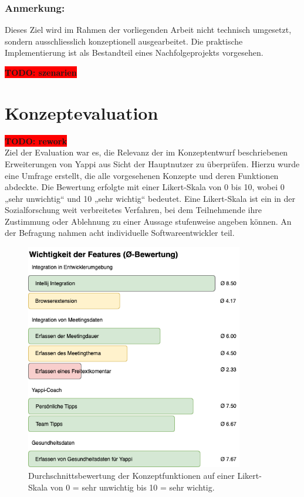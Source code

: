 \documentclass[12pt,a4paper]{report}
\newcommand{\todo}[1]{\colorbox{red}{\textbf{TODO: #1}}\\}
\begin{document}
\subsubsection{Anmerkung:}

Dieses Ziel wird im Rahmen der vorliegenden Arbeit nicht technisch umgesetzt, sondern ausschliesslich konzeptionell ausgearbeitet.
Die praktische Implementierung ist als Bestandteil eines Nachfolgeprojekts vorgesehen.

\todo{szenarien}

\section{Konzeptevaluation}

\todo{rework}

Ziel der Evaluation war es, die Relevanz der im Konzeptentwurf beschriebenen Erweiterungen von Yappi aus
Sicht der Hauptnutzer zu überprüfen.
Hierzu wurde eine Umfrage erstellt, die alle vorgesehenen Konzepte und deren Funktionen abdeckte.
Die Bewertung erfolgte mit einer Likert-Skala von 0 bis 10, wobei 0 „sehr unwichtig“ und 10 „sehr wichtig“ bedeutet.
Eine Likert-Skala ist ein in der Sozialforschung weit verbreitetes Verfahren, bei dem Teilnehmende ihre Zustimmung
oder Ablehnung zu einer Aussage stufenweise angeben können.
An der Befragung nahmen acht individuelle Softwareentwickler teil.

\begin{figure}[!htbp]
  \centering
  \includegraphics[width=0.85\textwidth]{../figures/konzept-eval-feature-wichtigkeit.drawio.png}
  \caption{Durchschnittsbewertung der Konzeptfunktionen auf einer Likert-Skala von 0 = sehr unwichtig bis 10 = sehr wichtig.}
  \label{fig:konzept-eval-feature-wichtigkeit}
\end{figure}
\end{document}

